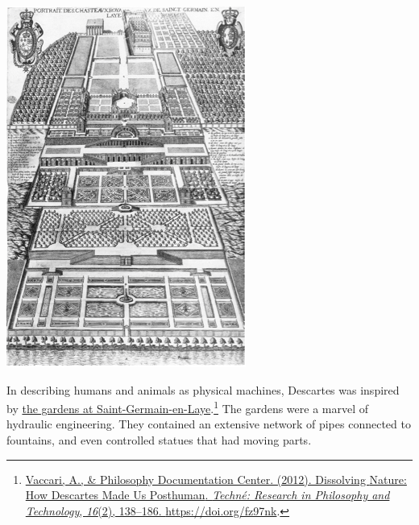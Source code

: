 \documentclass[
  oneside,
  12pt]{crumpbook}
\newenvironment{floatleft25}{%
  \wrapfigure{L}{.25\textwidth}%
  }{%
  \endwrapfigure}
\begin{document}
\begin{floatleft25}
\includegraphics[width=1\linewidth]{imgs/st_germain}

\end{floatleft25}

In describing humans and animals as physical machines, Descartes was inspired by \href{https://en.wikipedia.org/wiki/Château_de_Saint-Germain-en-Laye\#16th–18th_centuries}{the gardens at Saint-Germain-en-Laye}.\footnote{\protect\hyperlink{ref-vaccariDissolvingNatureHow2012}{Vaccari, A., \& Philosophy Documentation Center. (2012). Dissolving {Nature}: {How Descartes Made Us Posthuman}. \emph{Techné: Research in Philosophy and Technology}, \emph{16}(2), 138--186. \url{https://doi.org/fz97nk}}.} The gardens were a marvel of hydraulic engineering. They contained an extensive network of pipes connected to fountains, and even controlled statues that had moving parts.
\end{document}
